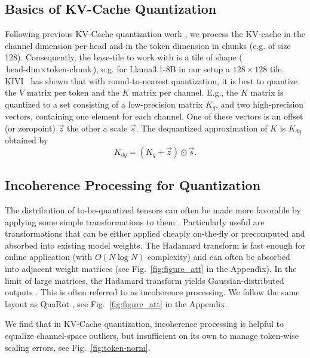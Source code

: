\documentclass{article}
\begin{document}
\subsection{Basics of KV-Cache Quantization}
Following previous KV-Cache quantization work \cite{KIVI}, we process the KV-cache in the channel dimension per-head and in the token dimension in chunks (e.g. of size 128). Consequently, the base-tile to work with is a tile of shape ($\text{head-dim}\times \text{token-chunk}$), e.g. for Llama3.1-8B in our setup a $128\times128$ tile. KIVI~\cite{KIVI} has shown that with round-to-nearest quantization, it is best to  quantize the $V$ matrix per token and the $K$ matrix per channel. E.g., the $K$  matrix is quantized to a set consisting of a low-precision matrix $K_q$, and two high-precision vectors, containing one element for each channel. One of these vectors is an offset (or zeropoint) $\vec{z}$ the other a scale $\vec{s}$. The dequantized approximation of $K$ is $K_{dq}$ obtained by
\begin{equation}
    K_{dq} = (K_q + \vec{z}) \odot \vec{s}. 
\end{equation}


\subsection{Incoherence Processing for Quantization}
\label{sec:rotate}
The distribution of to-be-quantized tensors can often be made more favorable by applying some simple transformations to them \cite{ashkboos2024quarot, liu2025spinquant}. Particularly useful are transformations that can be either applied cheaply on-the-fly or precomputed and absorbed into existing model weights. The Hadamard transform is fast enough for online application (with $O(N \log N)$ complexity) and can often be absorbed into adjacent weight matrices (see Fig.~\ref{fig:figure_att} in the Appendix). In the limit of large matrices, the Hadamard transform yields Gaussian-distributed outputs \cite{malinovskii2025higgs, chee2023quip, tseng2024qtip}. This is often referred to as incoherence processing. We follow the same layout as QuaRot \cite{ashkboos2024quarot}, see Fig.~\ref{fig:figure_att} in the Appendix.

We find that in KV-Cache quantization, incoherence processing is helpful to equalize channel-space outliers, but insufficient on its own to manage token-wise scaling errors, see Fig.~\ref{fig:token-norm}.
\end{document}
